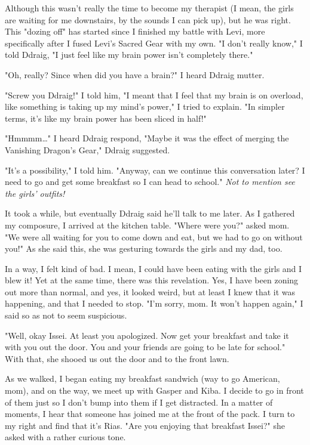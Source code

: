\documentclass{article}
\begin{document}
Although this wasn't really the time to become my therapist (I mean, the girls are waiting for me downstairs, by the sounds I can pick up), but he was right. This "dozing off" has started since I finished my battle with Levi, more specifically after I fused Levi's Sacred Gear with my own. "I don't really know," I told Ddraig, "I just feel like my brain power isn't completely there."

"Oh, really? Since when did you have a brain?" I heard Ddraig mutter.

"Screw you Ddraig!" I told him, "I meant that I feel that my brain is on overload, like something is taking up my mind's power," I tried to explain. "In simpler terms, it's like my brain power has been sliced in half!"

"Hmmmm…" I heard Ddraig respond, "Maybe it was the effect of merging the Vanishing Dragon's Gear," Ddraig suggested.

"It's a possibility," I told him. "Anyway, can we continue this conversation later? I need to go and get some breakfast so I can head to school." \emph{Not to mention see the girls' outfits!}

It took a while, but eventually Ddraig said he'll talk to me later. As I gathered my composure, I arrived at the kitchen table. "Where were you?" asked mom. "We were all waiting for you to come down and eat, but we had to go on without you!" As she said this, she was gesturing towards the girls and my dad, too.

In a way, I felt kind of bad. I mean, I could have been eating with the girls and I blew it! Yet at the same time, there was this revelation. Yes, I have been zoning out more than normal, and yes, it looked weird, but at least I knew that it was happening, and that I needed to stop. "I'm sorry, mom. It won't happen again," I said so as not to seem suspicious.

"Well, okay Issei. At least you apologized. Now get your breakfast and take it with you out the door. You and your friends are going to be late for school." With that, she shooed us out the door and to the front lawn.

As we walked, I began eating my breakfast sandwich (way to go American, mom), and on the way, we meet up with Gasper and Kiba. I decide to go in front of them just so I don't bump into them if I get distracted. In a matter of moments, I hear that someone has joined me at the front of the pack. I turn to my right and find that it's Rias. "Are you enjoying that breakfast Issei?" she asked with a rather curious tone.
\end{document}
